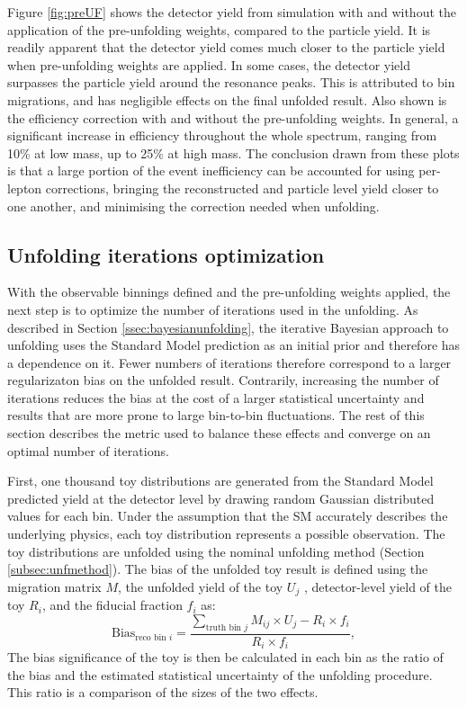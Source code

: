 
Figure \ref{fig:preUF} shows the detector yield from simulation with and without the application of the pre-unfolding weights, compared to the particle yield. It is readily apparent that the detector yield comes much closer to the particle yield when pre-unfolding weights are applied. In some cases, the detector yield surpasses the particle yield around the resonance peaks. This is attributed to bin migrations, and has negligible effects on the final unfolded result. Also shown is the efficiency correction with and without the pre-unfolding weights. In general, a significant increase in efficiency throughout the whole \mFourL spectrum, ranging from 10\% at low mass, up to 25\% at high mass. The conclusion drawn from these plots is that a large portion of the event inefficiency can be accounted for using per-lepton corrections, bringing the reconstructed and particle level yield closer to one another, and minimising the correction needed when unfolding.

\subsection{Unfolding iterations optimization}
\label{ssec:unfoldingiterations}
With the observable binnings defined and the pre-unfolding weights applied, the next step is to optimize the number of iterations used in the unfolding. As described in Section \ref{ssec:bayesianunfolding}, the iterative Bayesian approach to unfolding uses the Standard Model prediction as an initial prior and therefore has a dependence on it. Fewer numbers of iterations therefore correspond to a larger regularizaton bias on the unfolded result. Contrarily, increasing the number of iterations reduces the bias at the cost of a larger statistical uncertainty and results that are more prone to large bin-to-bin fluctuations. The rest of this section describes the metric used to balance these effects and converge on an optimal number of iterations.

First, one thousand toy distributions are generated from the Standard Model predicted yield at the detector level by drawing random Gaussian distributed values for each bin. Under the assumption that the SM accurately describes the underlying physics, each toy distribution represents a possible observation. The toy distributions are unfolded using the nominal unfolding method (Section \ref{subsec:unfmethod}). The bias of the unfolded toy result is defined using the migration matrix $M$, the unfolded yield of the toy $U_{j}$ , detector-level yield of the toy $R_i$, and the fiducial fraction $f_i$ as:
\begin{equation*}
  \text{Bias}_{\text{reco bin }i} = \frac{\sum\limits_{\text{truth bin }j} M_{ij} \times U_{j} - R_{i} \times f_{i} }{R_{i} \times f_{i}},
\end{equation*}
The bias significance of the toy is then be calculated in each bin as the ratio of the bias and the estimated statistical uncertainty of the unfolding procedure. This ratio is a comparison of the sizes of the two effects. 

